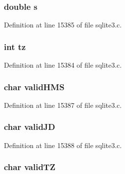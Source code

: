 \hypertarget{struct_date_time_ad62e712560f6344b96d4c080a2ba9c92}{}
\subsubsection[{s}]{\setlength{\rightskip}{0pt plus 5cm}double s}\label{struct_date_time_ad62e712560f6344b96d4c080a2ba9c92}


Definition at line 15385 of file sqlite3.\+c.

\hypertarget{struct_date_time_a5c28a2389e07dda8a40b2d5510541719}{}
\subsubsection[{tz}]{\setlength{\rightskip}{0pt plus 5cm}int tz}\label{struct_date_time_a5c28a2389e07dda8a40b2d5510541719}


Definition at line 15384 of file sqlite3.\+c.

\hypertarget{struct_date_time_a68511d770b1afeac58600ae09425c5a9}{}
\subsubsection[{valid\+H\+M\+S}]{\setlength{\rightskip}{0pt plus 5cm}char valid\+H\+M\+S}\label{struct_date_time_a68511d770b1afeac58600ae09425c5a9}


Definition at line 15387 of file sqlite3.\+c.

\hypertarget{struct_date_time_a5953eb07d3a0d4d2b6d32143ad689c4b}{}
\subsubsection[{valid\+J\+D}]{\setlength{\rightskip}{0pt plus 5cm}char valid\+J\+D}\label{struct_date_time_a5953eb07d3a0d4d2b6d32143ad689c4b}


Definition at line 15388 of file sqlite3.\+c.

\hypertarget{struct_date_time_a404804a749be5d0bff9dd31a0105ca2f}{}
\subsubsection[{valid\+T\+Z}]{\setlength{\rightskip}{0pt plus 5cm}char valid\+T\+Z}\label{struct_date_time_a404804a749be5d0bff9dd31a0105ca2f}



